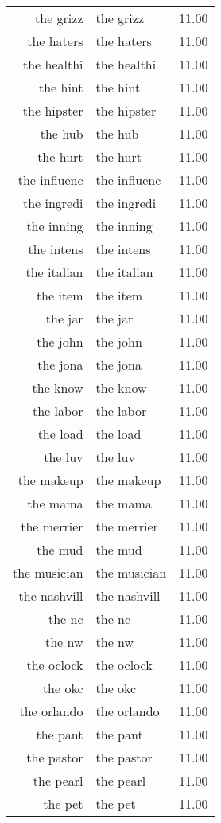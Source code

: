 \begin{table}[ht]
\begin{tabular}{rlr}
  the grizz & the grizz & 11.00 \\ 
  the haters & the haters & 11.00 \\ 
  the healthi & the healthi & 11.00 \\ 
  the hint & the hint & 11.00 \\ 
  the hipster & the hipster & 11.00 \\ 
  the hub & the hub & 11.00 \\ 
  the hurt & the hurt & 11.00 \\ 
  the influenc & the influenc & 11.00 \\ 
  the ingredi & the ingredi & 11.00 \\ 
  the inning & the inning & 11.00 \\ 
  the intens & the intens & 11.00 \\ 
  the italian & the italian & 11.00 \\ 
  the item & the item & 11.00 \\ 
  the jar & the jar & 11.00 \\ 
  the john & the john & 11.00 \\ 
  the jona & the jona & 11.00 \\ 
  the know & the know & 11.00 \\ 
  the labor & the labor & 11.00 \\ 
  the load & the load & 11.00 \\ 
  the luv & the luv & 11.00 \\ 
  the makeup & the makeup & 11.00 \\ 
  the mama & the mama & 11.00 \\ 
  the merrier & the merrier & 11.00 \\ 
  the mud & the mud & 11.00 \\ 
  the musician & the musician & 11.00 \\ 
  the nashvill & the nashvill & 11.00 \\ 
  the nc & the nc & 11.00 \\ 
  the nw & the nw & 11.00 \\ 
  the oclock & the oclock & 11.00 \\ 
  the okc & the okc & 11.00 \\ 
  the orlando & the orlando & 11.00 \\ 
  the pant & the pant & 11.00 \\ 
  the pastor & the pastor & 11.00 \\ 
  the pearl & the pearl & 11.00 \\ 
  the pet & the pet & 11.00 \\ 

\end{tabular}
\end{table}
